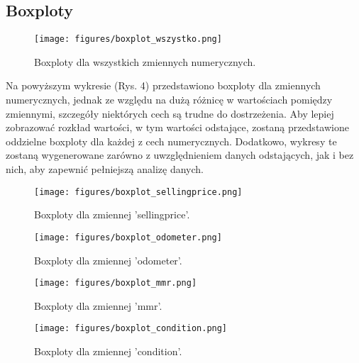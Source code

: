 \documentclass[10pt,letterpaper]{article}
\begin{document}
\subsection{Boxploty}
\begin{figure}[H]
\begin{center}
   \texttt{[image: figures/boxplot\_wszystko.png]}
   \caption{Boxploty dla wszystkich zmiennych numerycznych.}
   \label{fig:other-figure-log}
\end{center}
\end{figure}
Na powyższym wykresie (Rys. 4) przedstawiono boxploty dla zmiennych numerycznych, jednak ze względu na dużą różnicę w wartościach pomiędzy zmiennymi, szczegóły niektórych cech są trudne do dostrzeżenia. Aby lepiej zobrazować rozkład wartości, w tym wartości odstające, zostaną przedstawione oddzielne boxploty dla każdej z cech numerycznych. Dodatkowo, wykresy te zostaną wygenerowane zarówno z uwzględnieniem danych odstających, jak i bez nich, aby zapewnić pełniejszą analizę danych.

\begin{figure}[H]
\begin{center}
   \texttt{[image: figures/boxplot\_sellingprice.png]}
   \caption{Boxploty dla zmiennej 'sellingprice'.}
   \label{fig:other-figure-log}
\end{center}
\end{figure}

\begin{figure}[H]
\begin{center}
   \texttt{[image: figures/boxplot\_odometer.png]}
   \caption{Boxploty dla zmiennej 'odometer'.}
   \label{fig:other-figure-log}
\end{center}
\end{figure}

\begin{figure}[H]
\begin{center}
   \texttt{[image: figures/boxplot\_mmr.png]}
   \caption{Boxploty dla zmiennej 'mmr'.}
   \label{fig:other-figure-log}
\end{center}
\end{figure}

\begin{figure}[H]
\begin{center}
   \texttt{[image: figures/boxplot\_condition.png]}
   \caption{Boxploty dla zmiennej 'condition'.}
   \label{fig:other-figure-log}
\end{center}
\end{figure}
\end{document}
